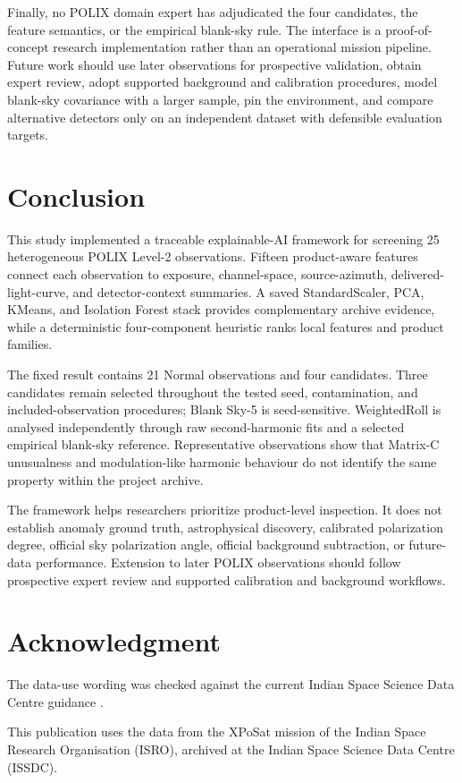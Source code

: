 \documentclass[conference]{IEEEtran}
\begin{document}
Finally, no POLIX domain expert has adjudicated the four candidates, the feature semantics, or the empirical blank-sky rule. The interface is a proof-of-concept research implementation rather than an operational mission pipeline. Future work should use later observations for prospective validation, obtain expert review, adopt supported background and calibration procedures, model blank-sky covariance with a larger sample, pin the environment, and compare alternative detectors only on an independent dataset with defensible evaluation targets.


\section{Conclusion}

This study implemented a traceable explainable-AI framework for screening 25 heterogeneous POLIX Level-2 observations. Fifteen product-aware features connect each observation to exposure, channel-space, source-azimuth, delivered-light-curve, and detector-context summaries. A saved StandardScaler, PCA, KMeans, and Isolation Forest stack provides complementary archive evidence, while a deterministic four-component heuristic ranks local features and product families.


The fixed result contains 21 Normal observations and four candidates. Three candidates remain selected throughout the tested seed, contamination, and included-observation procedures; Blank Sky-5 is seed-sensitive. WeightedRoll is analysed independently through raw second-harmonic fits and a selected empirical blank-sky reference. Representative observations show that Matrix-C unusualness and modulation-like harmonic behaviour do not identify the same property within the project archive.


The framework helps researchers prioritize product-level inspection. It does not establish anomaly ground truth, astrophysical discovery, calibrated polarization degree, official sky polarization angle, official background subtraction, or future-data performance. Extension to later POLIX observations should follow prospective expert review and supported calibration and background workflows.


\section*{Acknowledgment}

The data-use wording was checked against the current Indian Space Science Data Centre guidance \cite{issdc_xposat_ack}.


This publication uses the data from the XPoSat mission of the Indian Space Research Organisation (ISRO), archived at the Indian Space Science Data Centre (ISSDC).





\end{document}
